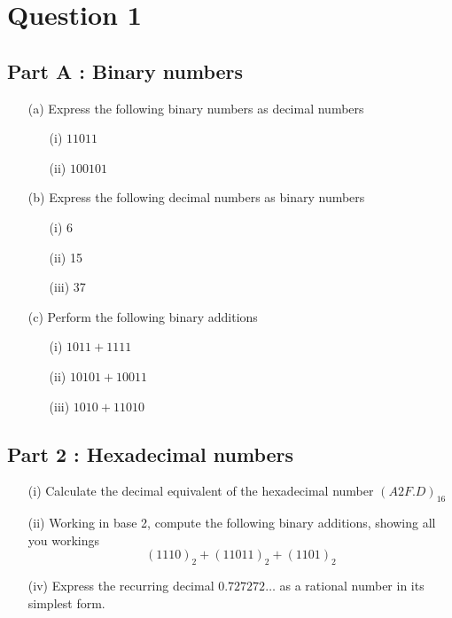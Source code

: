 \section*{Question 1}
\subsection*{Part A :  Binary numbers}
\begin{itemize}
\item[(a)] Express the following binary numbers as decimal numbers
\begin{itemize}
\item[(i)] $11011$
\item[(ii)] $100101$
\end{itemize}
\item[(b)] Express the following decimal numbers as binary numbers
\begin{itemize}
\item[(i)] 6
\item[(ii)] 15
\item[(iii)] 37
\end{itemize}
\item[(c)] Perform the following binary additions
\begin{itemize}
\item[(i)] $1011+ 1111$
\item[(ii)] $10101  + 10011$
\item[(iii)] $1010 + 11010$
\end{itemize}

\end{itemize}
\subsection*{Part 2 : Hexadecimal numbers}
\begin{itemize}
	\item[(i)] Calculate the decimal equivalent of the hexadecimal number $(A2F.D)_{16}$
	\item[(ii)] Working in base 2, compute the following binary additions, showing all you workings
	\[(1110)_2 + (11011)_2 + (1101)_2 \]
	\item[(iv)] Express the recurring decimal $0.727272\ldots$ as a rational number in its simplest form.
\end{itemize}


